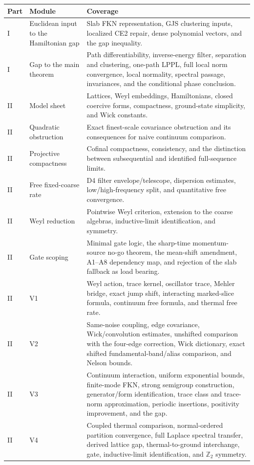 \documentclass[11pt,a4paper]{article}
\begin{document}
\begin{longtable}{P{1.0cm}P{5.1cm}P{7.6cm}}
\toprule
Part & Module & Coverage \\
\midrule
\endhead
I & Euclidean input to the Hamiltonian gap & Slab FKN representation, GJS clustering
inputs, localized CE2 repair, dense polynomial vectors, and the gap inequality. \\
I & Gap to the main theorem & Path differentiability, inverse-energy filter,
separation and clustering, one-path LPPL, full local norm convergence, local
normality, spectral passage, invariances, and the conditional phase conclusion. \\
II & Model sheet & Lattices, Weyl embeddings, Hamiltonians, closed coercive forms,
compactness, ground-state simplicity, and Wick constants. \\
II & Quadratic obstruction & Exact finest-scale covariance obstruction and its
consequences for naive continuum comparison. \\
II & Projective compactness & Cofinal compactness, consistency, and the distinction
between subsequential and identified full-sequence limits. \\
II & Free fixed-coarse rate & D4 filter envelope/telescope, dispersion estimates,
low/high-frequency split, and quantitative free convergence. \\
II & Weyl reduction & Pointwise Weyl criterion, extension to the coarse algebras,
inductive-limit identification, and symmetry. \\
II & Gate scoping & Minimal gate logic, the sharp-time momentum-source no-go theorem,
the mean-shift amendment, A1--A8 dependency map, and rejection of the slab fallback as
load bearing. \\
II & V1 & Weyl action, trace kernel, oscillator trace, Mehler bridge, exact jump
shift, interacting marked-slice formula, continuum free formula, and thermal free
rate. \\
II & V2 & Same-noise coupling, edge covariance, Wick/convolution estimates,
unshifted comparison with the four-edge correction, Wick dictionary, exact shifted
fundamental-band/alias comparison, and Nelson bounds. \\
II & V3 & Continuum interaction, uniform exponential bounds, finite-mode FKN,
strong semigroup construction, generator/form identification, trace class and
trace-norm approximation, periodic insertions, positivity improvement, and the gap. \\
II & V4 & Coupled thermal comparison, normal-ordered partition convergence, full
Laplace spectral transfer, derived lattice gap, thermal-to-ground interchange, gate,
inductive-limit identification, and $\mathbb Z_2$ symmetry. \\
\bottomrule
\end{longtable}
\end{document}
